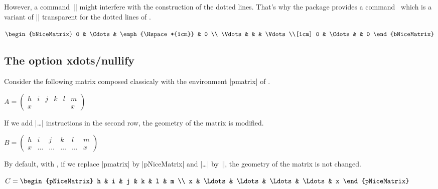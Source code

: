 \documentclass[dvipsnames]{article}
\begin{document}
However, a command~|\hspace*| might interfere with the construction of the
dotted lines. That's why the package  provides a
command~ which is a variant of |\hspace| transparent
for the dotted lines of .

\nobreak
\bigskip
\begin{Code}[width=10cm,show-output]
$\begin{bNiceMatrix}
0      & \Cdots & \emph{\Hspace*{1cm}} & 0      \\
\Vdots &        &               & \Vdots \\[1cm]
0      & \Cdots &               & 0    
\end{bNiceMatrix}$
\end{Code}


\subsection{The option xdots/nullify}

\label{nullify-dots}

Consider the following matrix composed classicaly with the environment
|{pmatrix}| of .


\nobreak
\medskip
\begin{Code}[width=10cm,show-output]
$A = \begin{pmatrix}
h & i & j & k & l & m \\
x &   &   &   &   & x 
\end{pmatrix}$
\end{Code}

\bigskip
If we add |\ldots| instructions in the second row, the geometry of the
matrix is modified.

\nobreak
\medskip
\begin{Code}[width=10cm,show-output]
$B = \begin{pmatrix}
h & i & j & k & l & m \\
x & \ldots & \ldots  & \ldots & \ldots & x 
\end{pmatrix}$
\end{Code}

\bigskip
By default, with , if we replace |{pmatrix}| by
|{pNiceMatrix}| and |\ldots| by |\Ldots|, the geometry of the matrix is not
changed.

\nobreak
\medskip
\begin{Code}[width=10cm,show-output]
$C = \begin{pNiceMatrix}
h & i & j & k & l & m \\
x & \Ldots & \Ldots & \Ldots & \Ldots & x 
\end{pNiceMatrix}$
\end{Code}
\end{document}

